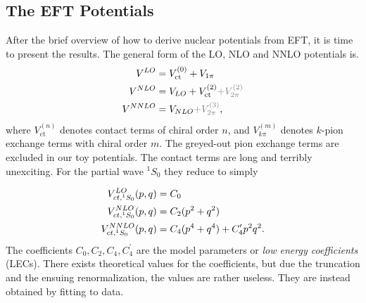 







\subsection{The EFT Potentials}

After the brief overview of how to derive nuclear potentials from EFT, it is
time to present the results. The general form of the LO, NLO and NNLO potentials is\cite[p.~30-36]{Machleidt_2011}.
\newcommand{\greyout}[1]{{\textcolor{gray}{#1}}}
\begin{align}
  V^{LO} &= V^{(0)}_{\text{ct}}+V_{1\pi}\\
  V^{NLO} &= V_{LO} + V_{\text{ct}}^{(2)} \greyout{+ V_{2\pi}^{(2)}}\\
  V^{NNLO} &= V_{NLO} \greyout{+ V_{2\pi}^{(3)}},
\end{align}
where \(V^{(n)}_{\text{ct}}\) denotes contact terms of chiral order \(n\), and
\(V^{(m)}_{k\pi}\) denotes \(k\)-pion exchange terms with chiral order \(m\).
The greyed-out pion exchange terms are excluded in our toy potentials.
The contact terms are long and terribly unexciting. For the partial wave
\(^{1}S_{0}\) they reduce to simply

\newcommand{\pso}[0]{{\prescript{1}{}{S_{0}}}}
\newcommand{\pp}[0]{q}%
\begin{align}
  \label{eq:contactterms}
  V^{LO}_{ct,\pso}(p, \pp) &= C_{0}\\
  V^{NLO}_{ct,\pso}(p, \pp) &= C_{2}(p^{2}+\pp^{2})\\
  V^{NNLO}_{ct,\pso}(p, \pp) &= C_{4}(p^{4}+\pp^{4}) + C_{4}^{\prime}p^{2}\pp^{2}.
\end{align}
The coefficients \(C_{0}, C_{2}, C_{4}, C_{4}^{\prime}\) are the model
parameters or \textit{low energy coefficients} (LECs).  There exists theoretical values for the coefficients, but due the truncation
and the ensuing renormalization, the values are rather useless. They
are instead obtained by fitting to data.


